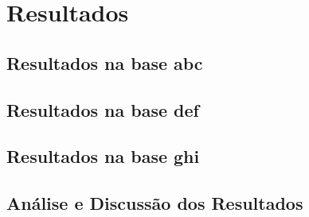 \chapter{Resultados}

\section{Resultados na base abc}
\section{Resultados na base def}
\section{Resultados na base ghi}

\section{Análise e Discussão dos Resultados}
